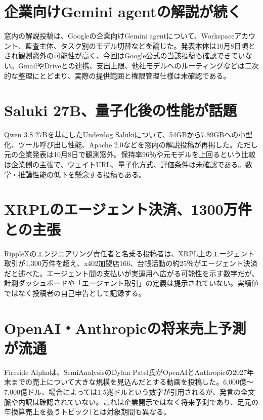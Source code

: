 \section{企業向けGemini agentの解説が続く}
窓内の解説投稿は、Googleの企業向けGemini agentについて、Workspaceアカウント、監査主体、タスク別のモデル切替などを論じた。発表本体は10月8日頃とされ観測窓外の可能性が高く、今回はGoogle公式の当該投稿も確認できていない。GmailやDriveとの連携、支出上限、他社モデルへのルーティングなどは二次的な整理にとどまり、実際の提供範囲と権限管理仕様は未確認である。

\section{Saluki 27B、量子化後の性能が話題}
Qwen 3.8 27Bを基にしたUnderdog Salukiについて、54GBから7.89GBへの小型化、ツール呼び出し性能、Apache 2.0などを窓内の解説投稿が再掲した。ただし元の企業発表は10月8日で観測窓外。保持率96％や元モデルを上回るという比較は企業側の主張で、ウェイトURL、量子化方式、評価条件は未確認である。数学・推論性能の低下を懸念する投稿もある。

\section{XRPLのエージェント決済、1300万件との主張}
RippleXのエンジニアリング責任者と名乗る投稿者は、XRPL上のエージェント取引が1,300万件を超え、x402加盟店166、台帳活動の約25％がエージェント決済だと述べた。エージェント間の支払いが実運用へ広がる可能性を示す数字だが、計測ダッシュボードや「エージェント取引」の定義は提示されていない。実績値ではなく投稿者の自己申告として記録する。

\section{OpenAI・Anthropicの将来売上予測が流通}
Fireside Alphaは、SemiAnalysisのDylan Patel氏がOpenAIとAnthropicの2027年末までの売上について大きな規模を見込んだとする動画を投稿した。6,000億～7,000億ドル、場合によっては1.5兆ドルという数字が引用されるが、発言の全文脈や内訳は確認されていない。これは企業開示ではなく将来予測であり、足元の年換算売上を扱うトピック1とは対象期間も異なる。
